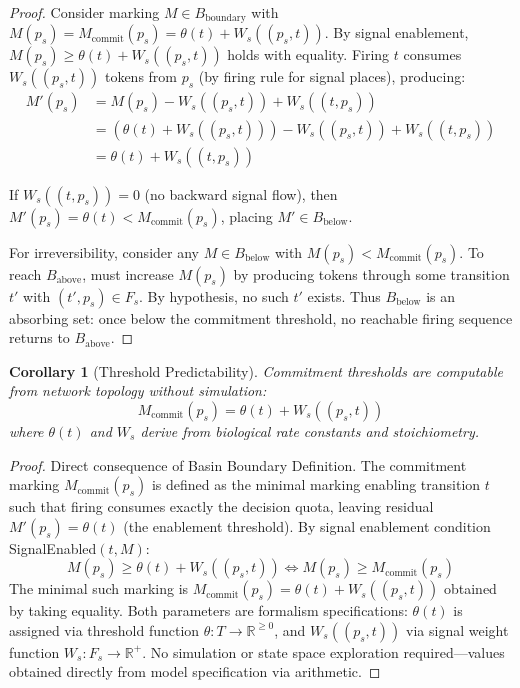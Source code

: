 \documentclass[10pt,letterpaper]{article}
\newtheorem{corollary}[theorem]{Corollary}
\begin{document}
\begin{proof}
Consider marking $M \in B_{\text{boundary}}$ with
$M(p_s) = M_{\text{commit}}(p_s) = \theta(t) + W_s((p_s,t))$.
By signal enablement, $M(p_s) \geq \theta(t) + W_s((p_s,t))$ holds with equality. Firing $t$ consumes $W_s((p_s,t))$ tokens from $p_s$ (by firing rule for signal places), producing:
\begin{align*}
M'(p_s) &= M(p_s) - W_s((p_s,t)) + W_s((t,p_s)) \\
&= (\theta(t) + W_s((p_s,t))) - W_s((p_s,t)) + W_s((t,p_s)) \\
&= \theta(t) + W_s((t,p_s))
\end{align*}

If $W_s((t,p_s)) = 0$ (no backward signal flow), then
$M'(p_s) = \theta(t) < M_{\text{commit}}(p_s)$,
placing $M' \in B_{\text{below}}$.

For irreversibility, consider any $M \in B_{\text{below}}$ with $M(p_s) < M_{\text{commit}}(p_s)$. To reach $B_{\text{above}}$, must increase $M(p_s)$ by producing tokens through some transition $t'$ with $(t',p_s) \in F_s$. By hypothesis, no such $t'$ exists. Thus $B_{\text{below}}$ is an absorbing set: once below the commitment threshold, no reachable firing sequence returns to $B_{\text{above}}$.
\end{proof}

\begin{corollary}[Threshold Predictability]
Commitment thresholds are computable from network topology without simulation:
\[
M_{\text{commit}}(p_s) = \theta(t) + W_s((p_s,t))
\]
where $\theta(t)$ and $W_s$ derive from biological rate constants and stoichiometry.
\end{corollary}

\begin{proof}
Direct consequence of Basin Boundary Definition. The commitment marking $M_{\text{commit}}(p_s)$ is defined as the minimal marking enabling transition $t$ such that firing consumes exactly the decision quota, leaving residual $M'(p_s) = \theta(t)$ (the enablement threshold). By signal enablement condition SignalEnabled$(t,M)$:
\begin{equation*}
M(p_s) \geq \theta(t) + W_s((p_s,t)) \iff M(p_s) \geq M_{\text{commit}}(p_s)
\end{equation*}
The minimal such marking is
$M_{\text{commit}}(p_s) = \theta(t) + W_s((p_s,t))$
obtained by taking equality. Both parameters are formalism specifications: $\theta(t)$ is assigned via threshold function $\theta: T \rightarrow \mathbb{R}^{\geq 0}$, and $W_s((p_s,t))$ via signal weight function $W_s: F_s \rightarrow \mathbb{R}^+$. No simulation or state space exploration required---values obtained directly from model specification via arithmetic.
\end{proof}
\end{document}
